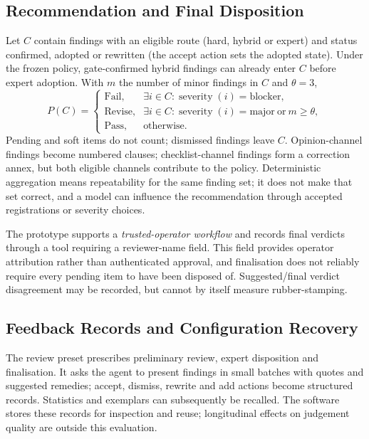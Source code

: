 \documentclass[computers,article,submit,moreauthors]{Definitions/mdpi}
\begin{document}
\subsection{Recommendation and Final Disposition}\label{sec:policy}

Let $C$ contain findings with an eligible route (hard, hybrid or expert) and status confirmed, adopted or rewritten (the accept action sets the adopted state). Under the frozen policy, gate-confirmed hybrid findings can already enter $C$ before expert adoption. With $m$ the number of minor findings in $C$ and $\theta=3$,
\begin{equation*}
P(C)=\begin{cases}
\text{Fail},&\exists i\in C:\operatorname{severity}(i)=\text{blocker},\\
\text{Revise},&\exists i\in C:\operatorname{severity}(i)=\text{major}\ \text{or}\ m\ge\theta,\\
\text{Pass},&\text{otherwise}.
\end{cases}
\end{equation*}
Pending and soft items do not count; dismissed findings leave $C$. Opinion-channel findings become numbered clauses; checklist-channel findings form a correction annex, but both eligible channels contribute to the policy. Deterministic aggregation means repeatability for the same finding set; it does not make that set correct, and a model can influence the recommendation through accepted registrations or severity choices.

The prototype supports a \emph{trusted-operator workflow} and records final verdicts through a tool requiring a reviewer-name field. This field provides operator attribution rather than authenticated approval, and finalisation does not reliably require every pending item to have been disposed of. Suggested/final verdict disagreement may be recorded, but cannot by itself measure rubber-stamping.

\subsection{Feedback Records and Configuration Recovery}\label{sec:memory}\label{sec:feedback}

The review preset prescribes preliminary review, expert disposition and finalisation. It asks the agent to present findings in small batches with quotes and suggested remedies; accept, dismiss, rewrite and add actions become structured records. Statistics and exemplars can subsequently be recalled. The software stores these records for inspection and reuse; longitudinal effects on judgement quality are outside this evaluation.
\end{document}
